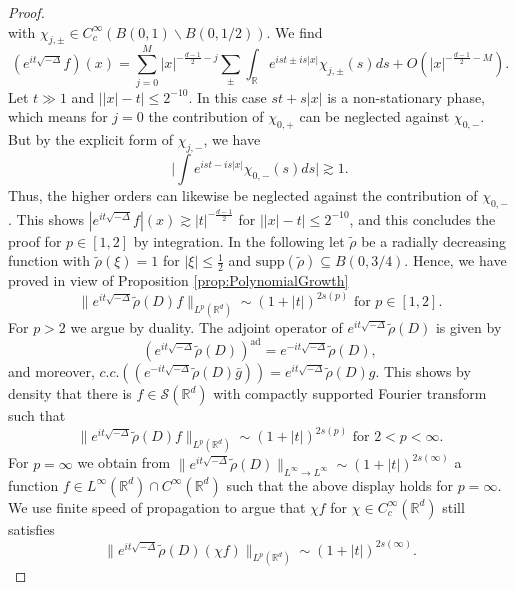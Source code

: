 \documentclass{amsart}
\theoremstyle{definition}
\newcommand{\R}{\mathbb{R}}
\numberwithin{equation}{section}
\begin{document}
\begin{proof}
\begin{equation*}
\end{equation*}
with $\chi_{j,\pm} \in C^\infty_c(B(0,1) \backslash B(0,1/2))$. We find
\begin{equation*}
(e^{it \sqrt{- \Delta}} f)(x) = \sum_{j=0}^M |x|^{-\frac{d-1}{2}-j} \sum_{\pm} \int_\R e^{is t \pm i s |x|} \chi_{j,\pm}(s) ds + O(|x|^{-\frac{d-1}{2}-M}).
\end{equation*}
Let $t \gg 1$ and $\big| |x| - t \big| \leq 2^{-10}$. In this case $st + s |x|$ is a non-stationary phase, which means for $j=0$ the contribution of $\chi_{0,+}$ can be neglected against $\chi_{0,-}$. But by the explicit form of $\chi_{j,-}$, we have
\begin{equation*}
\big| \int e^{ist - is|x|} \chi_{0,-}(s) ds \big| \gtrsim 1.
\end{equation*}
Thus, the higher orders can likewise be neglected against the contribution of $\chi_{0,-}$. This shows $| e^{it \sqrt{- \Delta}} f|(x) \gtrsim |t|^{-\frac{d-1}{2}}$ for $\big| |x| - t \big| \leq 2^{-10}$, and this concludes the proof for $p \in [1,2]$ by integration. In the following let $\tilde{\rho}$ be a radially decreasing function with $\tilde{\rho}(\xi) = 1$ for $|\xi| \leq \frac{1}{2}$ and $\text{supp}(\tilde{\rho}) \subseteq B(0,3/4)$. Hence, we have proved in view of Proposition \ref{prop:PolynomialGrowth}
\begin{equation*}
\| e^{it \sqrt{- \Delta}} \tilde{\rho}(D) f \|_{L^p(\R^d)} \sim (1+|t|)^{2 s(p)} \text{ for } p \in [1,2].
\end{equation*}
For $p>2$ we argue by duality. The adjoint operator of $e^{it \sqrt{-\Delta}} \tilde{\rho}(D)$ is given by
\begin{equation*}
(e^{it \sqrt{-\Delta}} \tilde{\rho}(D))^{\text{ad}} = e^{-it \sqrt{-\Delta}} \tilde{\rho}(D),
\end{equation*}
and moreover, $c.c. ((e^{-it \sqrt{-\Delta}} \tilde{\rho}(D) \bar{g})) = e^{it \sqrt{-\Delta}} \tilde{\rho}(D) g$. This shows by density that there is $f \in \mathcal{S}(\R^d)$ with compactly supported Fourier transform such that
\begin{equation*}
\| e^{it \sqrt{-\Delta}} \tilde{\rho}(D) f \|_{L^p(\R^d)} \sim (1+|t|)^{2s(p)} \text{ for } 2 < p <\infty.
\end{equation*}
For $p=\infty$ we obtain from $\| e^{it \sqrt{-\Delta}} \tilde{\rho}(D) \|_{L^\infty \to L^\infty} \sim (1+|t|)^{2s(\infty)}$ a function $f \in L^\infty(\R^d) \cap C^\infty(\R^d)$ such that the above display holds for $p=\infty$. We use finite speed of propagation to argue that $\chi f$ for $\chi \in C^\infty_c(\R^d)$ still satisfies
\begin{equation*}
\| e^{it \sqrt{-\Delta}} \tilde{\rho}(D) (\chi f) \|_{L^p(\R^d)} \sim (1+|t|)^{2s(\infty)}.
\end{equation*}

\end{proof}
\end{document}
